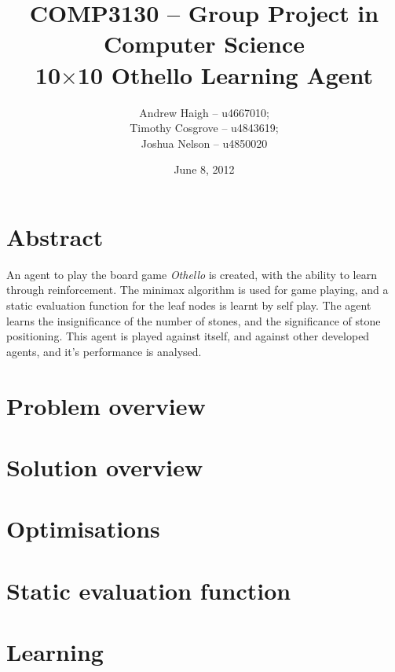 \documentclass[11pt,twocolumn]{article}
\title{COMP3130 -- Group Project in Computer Science\\ 10$\times$10 Othello Learning Agent}
\date{June 8, 2012}
\author{Andrew Haigh -- u4667010;\\ Timothy Cosgrove -- u4843619;\\ Joshua Nelson -- u4850020}
\begin{document}
\onecolumn
\maketitle
\clearpage
\section{Abstract}
An agent to play the board game \emph{Othello} is created, with the ability to learn through reinforcement. The minimax algorithm is used for game playing, and a static evaluation function for the leaf nodes is learnt by self play. The agent learns the insignificance of the number of stones, and the significance of stone positioning. This agent is played against itself, and against other developed agents, and it's performance is analysed.

\section{Problem overview}
\section{Solution overview}
\section{Optimisations}
\section{Static evaluation function}
\clearpage
\section{Learning}
\end{document}
